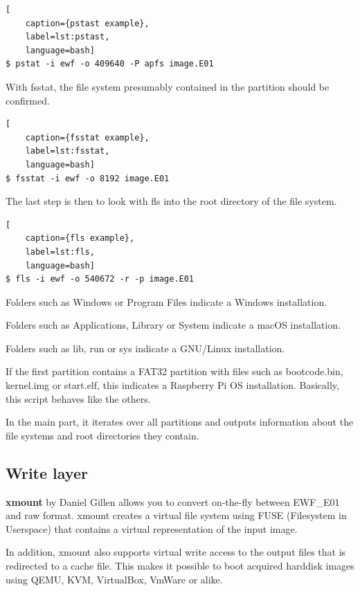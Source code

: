 \begin{lstlisting}[
    caption={pstast example},
    label=lst:pstast,
    language=bash]
$ pstat -i ewf -o 409640 -P apfs image.E01
\end{lstlisting}

With fsstat, the file system presumably contained in the partition should be confirmed.

\begin{lstlisting}[
    caption={fsstat example},
    label=lst:fsstat,
    language=bash]
$ fsstat -i ewf -o 8192 image.E01
\end{lstlisting}

\noindent The last step is then to look with fls into the root directory of the file system.

\begin{lstlisting}[
    caption={fls example},
    label=lst:fls,
    language=bash]
$ fls -i ewf -o 540672 -r -p image.E01
\end{lstlisting}

\noindent Folders such as Windows or \glqq{}Program Files\grqq{} indicate a Windows installation.

Folders such as Applications, Library or System indicate a macOS installation.

Folders such as lib, run or sys indicate a GNU/Linux installation.

If the first partition contains a FAT32 partition with files such as bootcode.bin, kernel.img or start.elf, this indicates a Raspberry Pi OS installation.\newline
\newline
\noindent Basically, this script behaves like the others.

In the main part, it iterates over all partitions and outputs information about the file systems and root directories they contain.

\subsection{Write layer}

\textbf{xmount} by Daniel Gillen allows you to convert on-the-fly between EWF\_E01 and raw format. xmount creates a virtual file system using FUSE (Filesystem in Userspace) that contains a virtual representation of the input image.

In addition, xmount also supports virtual write access to the output files that is redirected to a cache file. This makes it possible to boot acquired harddisk images using QEMU, KVM, VirtualBox, VmWare or alike.
 

